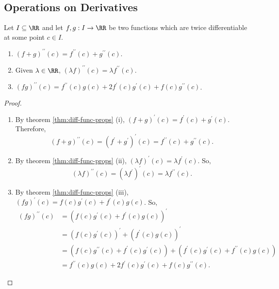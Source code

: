 \documentclass[../real_analysis.tex]{subfiles}
\begin{document}
        \subsection{Operations on Derivatives}\label{subsec:operations-on-derivatives}
            \begin{theorem}\label{thm:2nd-diff-func-props}
                Let $I\subseteq\RR$ and let $f,g:I\to\RR$ be two functions which are twice differentiable at some point $c\in I$.
                \begin{enumerate}[label={\upshape(\roman*)}]
                    \item $(f+g)^{\prime\prime}(c)=f^{\prime\prime}(c)+g^{\prime\prime}(c)$.
                    \item Given $\lambda\in\RR$, $(\lambda f)^{\prime\prime}(c)=\lambda f^{\prime\prime}(c)$.
                    \item $(fg)^{\prime\prime}(c)=f^{\prime\prime}(c)g(c)+2f^\prime(c)g^\prime(c)+f(c)g^{\prime\prime}(c)$.
                \end{enumerate}
            \end{theorem}
            \begin{proof}
                \begin{enumerate}[label={\upshape(\roman*)}]
                    \item By theorem \ref{thm:diff-func-props} (i), $(f+g)^\prime(c)=f^\prime(c)+g^\prime(c)$. Therefore,
                    \begin{equation}
                        (f+g)^{\prime\prime}(c)=(f^\prime+g^\prime)^\prime(c)=f^{\prime\prime}(c)+g^{\prime\prime}(c).
                    \end{equation}
                    \item By theorem \ref{thm:diff-func-props} (ii), $(\lambda f)^\prime(c)=\lambda f^\prime(c)$. So,
                    \begin{equation}
                        (\lambda f)^{\prime\prime}(c)=(\lambda f^\prime)^\prime(c)=\lambda f^{\prime\prime}(c).
                    \end{equation}
                    \item By theorem \ref{thm:diff-func-props} (iii), $(fg)^\prime(c)=f(c)g^\prime(c)+f^\prime(c)g(c)$. So,
                    \begin{align}
                        (fg)^{\prime\prime}(c)&=(f(c)g^\prime(c)+f^\prime(c)g(c))^\prime\\
                        &=(f(c)g^\prime(c))^\prime+(f^\prime(c)g(c))^\prime\\
                        &=(f(c)g^{\prime\prime}(c)+f^\prime(c)g^\prime(c))+(f^\prime(c)g^\prime(c)+f^{\prime\prime}(c)g(c))\\
                        &=f^{\prime\prime}(c)g(c)+2f^\prime(c)g^\prime(c)+f(c)g^{\prime\prime}(c).
                    \end{align}
                \end{enumerate}
            \end{proof}
\end{document}
